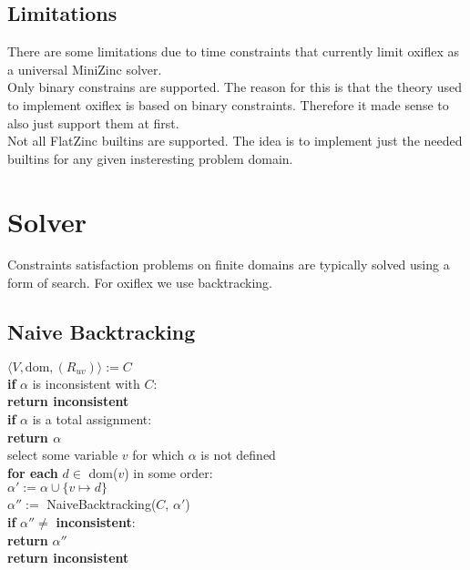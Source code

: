 \subsection{Limitations}

There are some limitations due to time constraints that currently limit oxiflex as a universal MiniZinc solver. \\

Only binary constrains are supported. The reason for this is that the theory used to implement oxiflex is based on binary constraints. Therefore it made sense to also just support them at first. \\

Not all FlatZinc builtins are supported. The idea is to implement just the needed builtins for any given insteresting problem domain.

\section{Solver}

Constraints satisfaction problems on finite domains are typically solved using a form of search. For oxiflex we use backtracking.

\subsection{Naive Backtracking}

\begin{tcolorbox}[title=function NaiveBacktracking)]
	$\langle V, \text{dom}, (R_{uv})\rangle := C$ \\
	\textbf{if} $\alpha$ is inconsistent with $C$: \\
	\textbf{return inconsistent} \\

	\textbf{if} $\alpha$ is a total assignment: \\
	\textbf{return $\alpha$} \\

	select some variable $v$ for which $\alpha$ is not defined \\
	\textbf{for each} $d \in$ dom($v$) in some order: \\
	$\alpha' := \alpha \cup \{v \mapsto d\}$ \\
	$\alpha'' := $ NaiveBacktracking($C$, $\alpha'$) \\
	\textbf{if} $\alpha'' \neq$ \textbf{inconsistent}: \\
	\textbf{return} $\alpha''$ \\

	\textbf{return inconsistent}
\end{tcolorbox}

